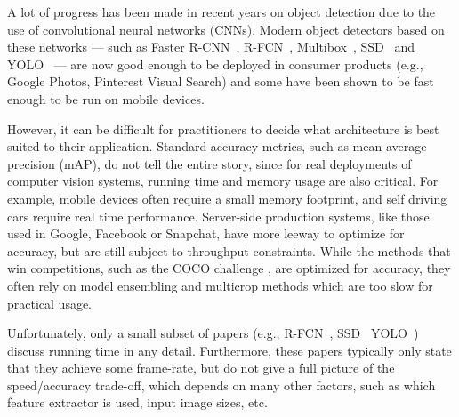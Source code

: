 \documentclass[10pt,twocolumn,letterpaper]{article}
\newcommand{\eat}[1]{}
\begin{document}
A lot of progress has been made in recent years on object detection
due to the use of convolutional neural networks (CNNs).  Modern object
detectors based on these networks --- such as
Faster R-CNN~\cite{ren2015faster},
R-FCN~\cite{dai2016r},
Multibox~\cite{szegedy2014scalable},
SSD~\cite{liu2015ssd} and
YOLO~\cite{redmon2015you} ---
are now good enough to be deployed in
consumer products (e.g., Google Photos, Pinterest Visual Search) and
some have been shown to be fast enough to be run on mobile devices.

However,
it can be difficult for practitioners to decide what architecture is best suited
to their application.  Standard accuracy metrics, such as mean average precision
(mAP), do not tell the entire story, since for real
deployments of computer vision systems, running time and memory usage
are also critical. For example,
mobile devices often require a small memory
footprint, and self driving cars require real time performance.
Server-side
production systems, like those used in Google, Facebook or
Snapchat,  have more leeway to optimize for accuracy,
but are still subject to throughput constraints.  While the methods that
win competitions, such as the COCO challenge
\cite{Lin2014coco},
are optimized for accuracy, they often rely on model ensembling and
multicrop methods which are too slow for practical usage.

\eat{
Choosing a detector is also not as simple as pointing to a single
paper (e.g., Faster R-CNN or YOLO) since many of these approaches are
better thought of as a choice of meta-architecture which requires a
number of further choices such as which base feature extractor to use
(e.g., VGG versus Resnet).  From this perspective, there exist a
number of tricks that can be played to trade off speed for accuracy
(e.g. by replacing feature extractors with less resource hungry
feature extractors or training the detectors on smaller input images).
Additionally, in many cases, the practitioner might care more about
accuracy for large objects (which are likely to be close to the
sensor) or for certain classes (such as people and cars for autonomous
driving).
}

Unfortunately, 
only a small subset of papers
(e.g., 
R-FCN~\cite{dai2016r},
SSD~\cite{liu2015ssd}
YOLO~\cite{redmon2015you})
discuss running time in any detail. Furthermore, these papers
typically only state that they achieve some frame-rate, but  do not give
a full picture of the speed/accuracy trade-off, which depends on many
other factors, such as which feature extractor is used, input image sizes,
etc.
\end{document}
